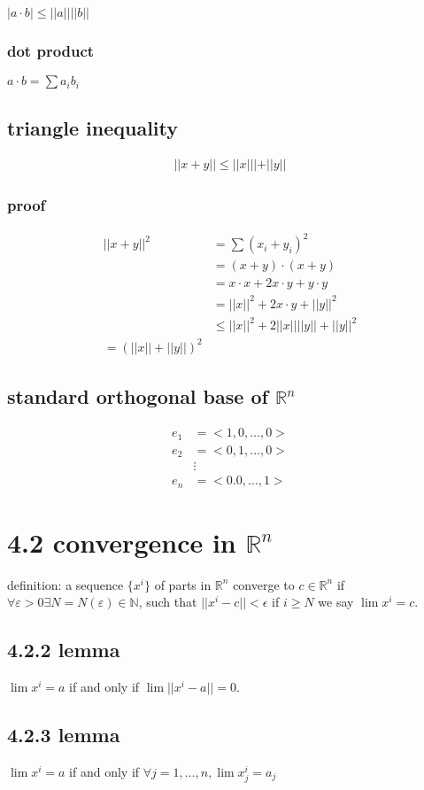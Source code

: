 \documentclass[letterpaper]{article}
\begin{document}
$|a\cdot b|\le||a||||b||$
\subsubsection*{dot product}
$a\cdot b=\sum\limits{a_ib_i}$
\subsection*{triangle inequality}
\begin{align*}
  ||x+y||\le||x|||+||y||
\end{align*}
\subsubsection*{proof}
\begin{align*}
  ||x+y||^2&=\sum\limits{(x_i+y_i)^2}\\
  &=(x+y)\cdot(x+y)\\
  &=x\cdot x+2x\cdot y+y\cdot y\\
  &=||x||^2+2x\cdot y+||y||^2\\
  &\le ||x||^2+2||x||||y||+||y||^2\\
  =(||x||+||y||)^2
\end{align*}

\subsection*{standard orthogonal base of $\mathbb{R}^n$}
\begin{align*}
  e_1&=<1,0,\dots,0>\\
  e_2&=<0,1,\dots,0>\\
  &\vdots\\
  e_n&=<0.0,\dots,1>
\end{align*}

\section*{4.2 convergence in $\mathbb{R}^n$}
definition:
a sequence $\{x^i\}$ of parts in $\mathbb{R}^n$ converge to $c\in \mathbb{R}^n$ if $\forall\varepsilon>0 \exists N=N(\varepsilon)\in\mathbb{N}$, such that $||x^i-c||<\epsilon$ if $i\ge N$ we say $\lim x^i=c$.

\subsection*{4.2.2 lemma}
$\lim  x^i=a$ if and only if $\lim ||x^i-a||=0$.

\subsection*{4.2.3 lemma}
$\lim x^i=a$ if and only if $\forall j=1,\dots,n, \lim x_j^i=a_j$ 
\end{document}
